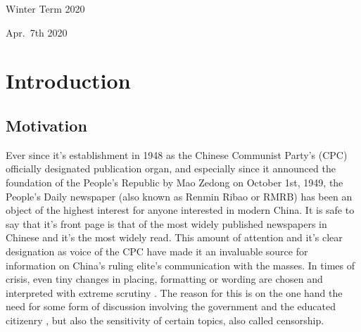 \documentclass[12pt,a4paper]{article}
\begin{document}
\begin{titlepage}
  \noindent\begin{minipage}[t]{0.5\textwidth}
  \end{minipage}
  \begin{minipage}[t]{0.7\textwidth}
  \hspace{1cm}Winter Term 2020
  \end{minipage}

  \noindent\begin{minipage}[t]{0.5\textwidth}
  \end{minipage}
  \begin{minipage}[t]{0.7\textwidth}
  \hspace{1cm}Apr.~7th 2020
  \end{minipage}

\end{titlepage}

\restoregeometry


{
\hypersetup{linkcolor=black}
\setcounter{tocdepth}{2}
\tableofcontents
}
\newpage
\listoftables
\newpage
\listoffigures
\newpage
{} 
\providecommand{\tightlist}{%
  \setlength{\itemsep}{0pt}\setlength{\parskip}{0pt}}

\hypertarget{introduction}{%
\section{Introduction}\label{introduction}}

\hypertarget{motivation}{%
\subsection{Motivation}\label{motivation}}

Ever since it's establishment in 1948 as the Chinese Communist Party's (CPC) officially designated publication organ, and especially since it announced the foundation of the People's Republic by Mao Zedong on October 1st, 1949, the People's Daily newspaper (also known as Renmin Ribao or RMRB) has been an object of the highest interest for anyone interested in modern China. It is safe to say that it's front page is that of the most widely published newspapers in Chinese and it's the most widely read. This amount of attention and it's clear designation as voice of the CPC have made it an invaluable source for information on China's ruling elite's communication with the masses. In times of crisis, even tiny changes in placing, formatting or wording are chosen and interpreted with extreme scrutiny \textcite{tan1990}. The reason for this is on the one hand the need for some form of discussion involving the government and the educated citizenry \textcite{kuhn2002}, but also the sensitivity of certain topics, also called censorship.
\end{document}
